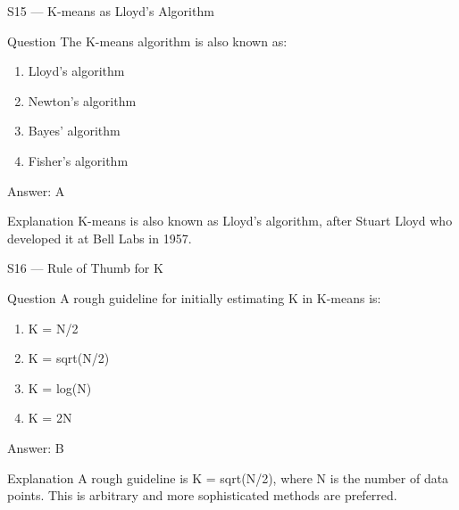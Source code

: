 \documentclass[aspectratio=169,8pt]{beamer}
\begin{document}
	\begin{frame}{S15 --- K-means as Lloyd's Algorithm}
		\begin{block}{Question}
			The K-means algorithm is also known as:
			\begin{enumerate}
				\item Lloyd's algorithm
				\item Newton's algorithm
				\item Bayes' algorithm
				\item Fisher's algorithm
			\end{enumerate}
		\end{block}
		\begin{exampleblock}{Answer: A}\end{exampleblock}
		\begin{block}{Explanation}
			K-means is also known as Lloyd's algorithm, after Stuart Lloyd who developed it at Bell Labs in 1957.
		\end{block}
	\end{frame}
	
	\begin{frame}{S16 --- Rule of Thumb for K}
		\begin{block}{Question}
			A rough guideline for initially estimating K in K-means is:
			\begin{enumerate}
				\item K = N/2
				\item K = sqrt(N/2)
				\item K = log(N)
				\item K = 2N
			\end{enumerate}
		\end{block}
		\begin{exampleblock}{Answer: B}\end{exampleblock}
		\begin{block}{Explanation}
			A rough guideline is K = sqrt(N/2), where N is the number of data points. This is arbitrary and more sophisticated methods are preferred.
		\end{block}
	\end{frame}
	
\end{document}
